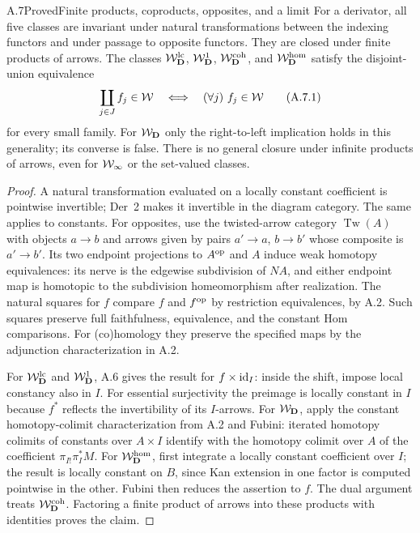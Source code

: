 \begin{claim}{A.7}{Proved}{Finite products, coproducts, opposites, and a limit}
For a derivator, all five classes are invariant under natural
transformations between the indexing functors and under passage to
opposite functors. They are closed under finite products of arrows.
The classes $\mathcal W_{\mathbf D}^{\mathrm{lc}}$, $\mathcal W_{\mathbf D}^{1}$, $\mathcal W_{\mathbf D}^{\mathrm{coh}}$, and $\mathcal W_{\mathbf D}^{\mathrm{hom}}$ satisfy the disjoint-union equivalence
\[
 \coprod_{j\in J}f_j\in\mathcal W
 \quad\Longleftrightarrow\quad (\forall j)\ f_j\in\mathcal W
 \tag{A.7.1}
\]
for every small family. For $\mathcal W_{\mathbf D}$ only the right-to-left implication
holds in this generality; its converse is false. There is no general closure under infinite
products of arrows, even for $\mathcal W_{\infty}$ or the set-valued classes.
\end{claim}
\begin{proof}
A natural transformation evaluated on a locally constant coefficient
is pointwise invertible; Der~2 makes it invertible in the diagram
category. The same applies to constants. For opposites, use the
twisted-arrow category $\operatorname{Tw}(A)$ with objects $a\to b$
and arrows given by pairs $a'\to a$, $b\to b'$ whose composite is
$a'\to b'$. Its two endpoint projections to $A^{\mathrm{op}}$ and $A$ induce
weak homotopy equivalences: its nerve is the edgewise subdivision of
$NA$, and either endpoint map is homotopic to the subdivision
homeomorphism after realization. The natural squares for $f$ compare
$f$ and $f^{\mathrm{op}}$ by restriction equivalences, by A.2. Such squares
preserve full faithfulness, equivalence, and the constant Hom
comparisons. For (co)homology they preserve the specified maps by
the adjunction characterization in A.2.

For $\mathcal W_{\mathbf D}^{\mathrm{lc}}$ and $\mathcal W_{\mathbf D}^{1}$, A.6 gives the result for $f\times\mathrm{id}_I$:
inside the shift, impose local constancy also in $I$. For essential
surjectivity the preimage is locally constant in $I$ because $f^*$
reflects the invertibility of its $I$-arrows. For $\mathcal W_{\mathbf D}$, apply the
constant homotopy-colimit characterization from A.2 and Fubini:
iterated homotopy colimits of constants over $A\times I$ identify with
the homotopy colimit over $A$ of the coefficient $\pi_{I!}\pi_I^*M$.
For $\mathcal W_{\mathbf D}^{\mathrm{hom}}$, first integrate a locally constant coefficient over
$I$; the result is locally constant on $B$, since Kan extension in
one factor is computed pointwise in the other. Fubini then reduces
the assertion to $f$. The dual argument treats $\mathcal W_{\mathbf D}^{\mathrm{coh}}$. Factoring a
finite product of arrows into these products with identities proves
the claim.


\end{proof}
